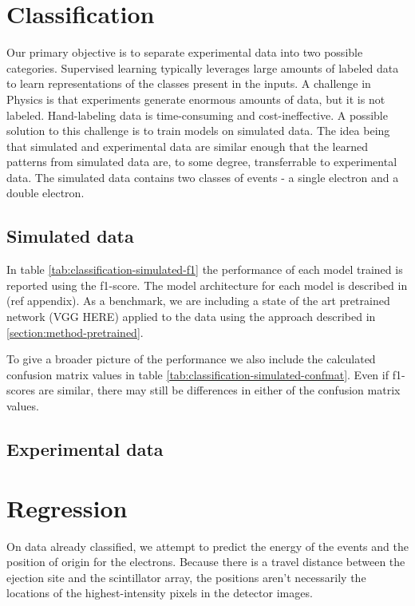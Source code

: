 \section{Classification}
Our primary objective is to separate experimental data into two possible categories.
Supervised learning typically leverages large amounts of labeled data to learn
representations of the classes present in the inputs. A challenge in Physics is that
experiments generate enormous amounts of data, but it is not labeled. Hand-labeling
data is time-consuming and cost-ineffective. A possible solution to this challenge
is to train models on simulated data. The idea being that simulated and experimental
data are similar enough that the learned patterns from simulated data are, to some degree,
transferrable to experimental data.
The simulated data contains two classes of events - a single electron and a double electron.

\subsection{Simulated data}
In table \ref{tab:classification-simulated-f1} the performance of each model 
trained is reported using the f1-score. The model architecture for each model is described in (ref appendix).
As a benchmark, we are including a state of the art pretrained network (\cite{}VGG HERE) applied to the data 
using the approach described in \ref{section:method-pretrained}.

To give a broader picture of the performance we also include the calculated confusion matrix values in
table \ref{tab:classification-simulated-confmat}. Even if f1-scores are similar, there may still be differences
in either of the confusion matrix values.



\subsection{Experimental data}

\section{Regression}
On data already classified, we attempt to predict the energy of the events and the position of origin for
the electrons. Because there is a travel distance between the ejection site and the scintillator array,
the positions aren't necessarily the locations of the highest-intensity pixels in the detector images.
